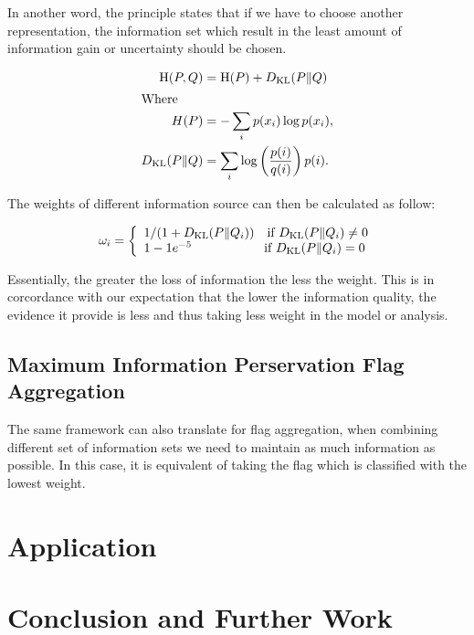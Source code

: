 \documentclass[nojss]{jss}
\begin{document}
In another word, the principle states that if we have to choose
another representation, the information set which result in the least
amount of information gain or uncertainty should be chosen.


\begin{align*}
  \mathrm{H}(P, Q) &=  \mathrm{H}(P) + D_{\mathrm{KL}}(P \| Q)\\
  \intertext{Where}
  H(P) &= -\sum_{i} {p(x_i) \log p(x_i)},\\
  D_{\mathrm{KL}}(P\|Q) &= \sum_i \log\left(\frac{p(i)}{q(i)}\right) p(i).\\
\end{align*}


The weights of different information source can then be calculated as
follow:

\begin{equation*}
  \omega_i = \left\{
  \begin{array}{l r}
    1/(1 + D_{\mathrm{KL}}(P\|Q_i)) \quad \text{if $D_{\mathrm{KL}}(P\|Q_i) \ne 0$}\\
    1 - 1e^{-5} \, \, \, \, \quad \quad \quad \quad \quad \text{if $D_{\mathrm{KL}}(P\|Q_i) = 0$}
  \end{array} \right.
\end{equation*}


Essentially, the greater the loss of information the less the
weight. This is in corcordance with our expectation that the lower the
information quality, the evidence it provide is less and thus taking
less weight in the model or analysis.



\subsection{Maximum Information Perservation Flag Aggregation}

The same framework can also translate for flag aggregation, when
combining different set of information sets we need to maintain as
much information as possible. In this case, it is equivalent of taking
the flag which is classified with the lowest weight.


\section{Application}



\section{Conclusion and Further Work}
\end{document}
